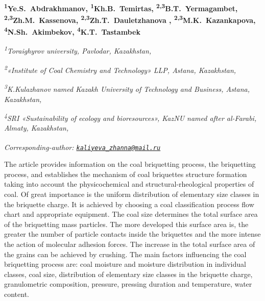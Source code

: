 
\begin{articleheader}

{\bfseries
\textsuperscript{1}Ye.S.~Abdrakhmanov,
\textsuperscript{1}Kh.B.~Temirtas,
\textsuperscript{2,3}B.T.~Yermagambet,
\textsuperscript{2,3}Zh.M.~Kassenova,
\textsuperscript{2,3}Zh.T.~Dauletzhanova\textsuperscript{\envelope } ,
\textsuperscript{2,3}M.K.~Kazankapova,
\textsuperscript{4}N.Sh.~Akimbekov,
\textsuperscript{4}K.T.~Tastambek}
\end{articleheader}

\begin{affiliation}
\emph{\textsuperscript{1}Toraighyrov university, Pavlodar, Kazakhstan,}

\emph{\textsuperscript{2}«Institute of Coal Chemistry and Technology» LLP, Astana, Kazakhstan,}

\emph{\textsuperscript{3}K.Kulazhanov named Kazakh University of Technology and Business, Astana, Kazakhstan,}

\emph{\textsuperscript{4}SRI «Sustainability of ecology and bioresources», KazNU named after al-Farabi, Almaty, Kazakhstan,}

\raggedright \textsuperscript{\envelope }{\em Corresponding-author: \href{mailto:kaliyeva_zhanna@mail.ru}{\nolinkurl{kaliyeva\_zhanna@mail.ru}}}
\end{affiliation}

The article provides information on the coal briquetting process, the
briquetting process, and establishes the mechanism of coal briquettes
structure formation taking into account the physicochemical and
structural-rheological properties of coal. Of great importance is the
uniform distribution of elementary size classes in the briquette charge.
It is achieved by choosing a coal classification process flow chart and
appropriate equipment. The coal size determines the total surface area
of the briquetting mass particles. The more developed this surface area
is, the greater the number of particle contacts inside the briquettes
and the more intense the action of molecular adhesion forces. The
increase in the total surface area of the grains can be achieved by
crushing. The main factors influencing the coal briquetting process are:
coal moisture and moisture distribution in individual classes, coal
size, distribution of elementary size classes in the briquette charge,
granulometric composition, pressure, pressing duration and temperature,
water content.

